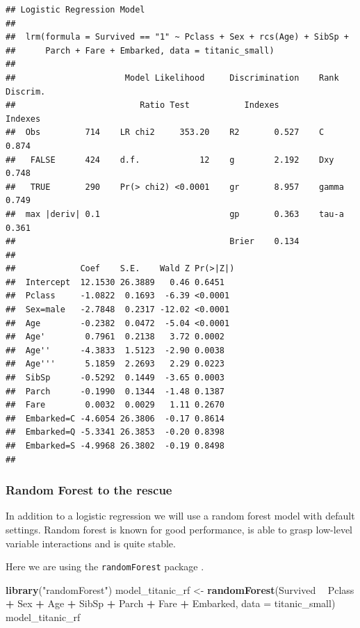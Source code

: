 \documentclass[]{krantz}
\newenvironment{Shaded}{\begin{snugshade}}{\end{snugshade}}
\newcommand{\DataTypeTok}[1]{\textcolor[rgb]{0.13,0.29,0.53}{#1}}
\newcommand{\KeywordTok}[1]{\textcolor[rgb]{0.13,0.29,0.53}{\textbf{#1}}}
\newcommand{\NormalTok}[1]{#1}
\newcommand{\OperatorTok}[1]{\textcolor[rgb]{0.81,0.36,0.00}{\textbf{#1}}}
\newcommand{\StringTok}[1]{\textcolor[rgb]{0.31,0.60,0.02}{#1}}
\theoremstyle{definition}
\theoremstyle{definition}
\theoremstyle{definition}
\theoremstyle{remark}
\begin{document}
\begin{verbatim}
## Logistic Regression Model
##  
##  lrm(formula = Survived == "1" ~ Pclass + Sex + rcs(Age) + SibSp + 
##      Parch + Fare + Embarked, data = titanic_small)
##  
##                      Model Likelihood     Discrimination    Rank Discrim.    
##                         Ratio Test           Indexes           Indexes       
##  Obs         714    LR chi2     353.20    R2       0.527    C       0.874    
##   FALSE      424    d.f.            12    g        2.192    Dxy     0.748    
##   TRUE       290    Pr(> chi2) <0.0001    gr       8.957    gamma   0.749    
##  max |deriv| 0.1                          gp       0.363    tau-a   0.361    
##                                           Brier    0.134                     
##  
##             Coef    S.E.    Wald Z Pr(>|Z|)
##  Intercept  12.1530 26.3889   0.46 0.6451  
##  Pclass     -1.0822  0.1693  -6.39 <0.0001 
##  Sex=male   -2.7848  0.2317 -12.02 <0.0001 
##  Age        -0.2382  0.0472  -5.04 <0.0001 
##  Age'        0.7961  0.2138   3.72 0.0002  
##  Age''      -4.3833  1.5123  -2.90 0.0038  
##  Age'''      5.1859  2.2693   2.29 0.0223  
##  SibSp      -0.5292  0.1449  -3.65 0.0003  
##  Parch      -0.1990  0.1344  -1.48 0.1387  
##  Fare        0.0032  0.0029   1.11 0.2670  
##  Embarked=C -4.6054 26.3806  -0.17 0.8614  
##  Embarked=Q -5.3341 26.3853  -0.20 0.8398  
##  Embarked=S -4.9968 26.3802  -0.19 0.8498  
## 
\end{verbatim}

\hypertarget{model_titanic_rf}{%
\subsubsection{Random Forest to the rescue}\label{model_titanic_rf}}

In addition to a logistic regression we will use a random forest model
with default settings. Random forest is known for good performance, is
able to grasp low-level variable interactions and is quite stable.

Here we are using the \texttt{randomForest} package
\citep{randomForestRNews}.

\begin{Shaded}
\begin{Highlighting}[]
\KeywordTok{library}\NormalTok{(}\StringTok{"randomForest"}\NormalTok{)}
\NormalTok{model_titanic_rf <-}\StringTok{ }\KeywordTok{randomForest}\NormalTok{(Survived }\OperatorTok{~}\StringTok{ }\NormalTok{Pclass }\OperatorTok{+}\StringTok{ }\NormalTok{Sex }\OperatorTok{+}\StringTok{ }\NormalTok{Age }\OperatorTok{+}\StringTok{ }\NormalTok{SibSp }\OperatorTok{+}\StringTok{ }
\StringTok{                           }\NormalTok{Parch }\OperatorTok{+}\StringTok{ }\NormalTok{Fare }\OperatorTok{+}\StringTok{ }\NormalTok{Embarked, }
                           \DataTypeTok{data =}\NormalTok{ titanic_small)}
\NormalTok{model_titanic_rf}
\end{Highlighting}
\end{Shaded}
\end{document}
